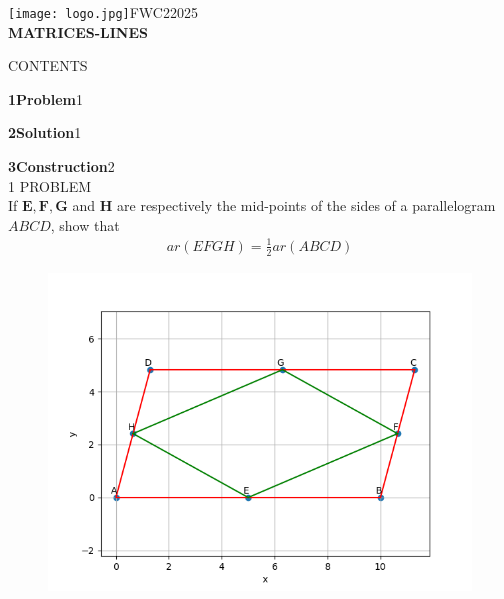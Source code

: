 \documentclass[a4paper,12pt]{report}
\let\vec\mathbf
\begin{document}
\raggedright{\texttt{[image: logo.jpg]}}\hspace{12.425cm}\raggedleft FWC22025\vspace{2mm}\\
\centering\Large\textbf{MATRICES-LINES}\vspace{5mm}
\begin{multicols}{2}
\centering \large\textsc{C}\footnotesize\textsc{ONTENTS}\vspace{5mm}\\
\raggedright\large\textbf{1\hspace{1cm}Problem}\hspace{5.18cm}1\vspace{5mm}\\
\raggedright\large\textbf{2\hspace{1cm}Solution}\hspace{5.25cm}1\vspace{5mm}\\
\raggedright\large\textbf{3\hspace{1cm}Construction}\hspace{4.27cm}2\vspace{5mm}\\
\centering \large\textsc{1  P}\footnotesize\textsc{ROBLEM}\vspace{5mm}\\
\fi
If $\vec{E}, \vec{F}, \vec{G}$ and $\vec{H}$  are respectively the mid-points of the sides of a parallelogram  $ABCD$, show that
	\begin{align}
ar(EFGH) =\frac{1}{2} ar(ABCD)
		\label{eq:9/9/2/2/}
	\end{align}
	\begin{figure}[!ht]
		\centering
 \includegraphics[width=\columnwidth]{chapters/9/9/2/2/figs/main.png}

\end{figure}
\end{multicols}
\end{document}
